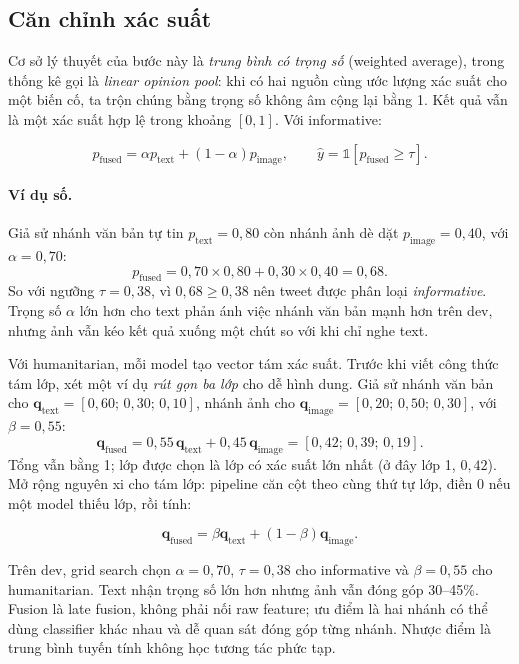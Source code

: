 \subsection{Căn chỉnh xác suất}

Cơ sở lý thuyết của bước này là \emph{trung bình có trọng số} (weighted average),
trong thống kê gọi là \emph{linear opinion pool}: khi có hai nguồn cùng ước
lượng xác suất cho một biến cố, ta trộn chúng bằng trọng số không âm cộng lại
bằng 1. Kết quả vẫn là một xác suất hợp lệ trong khoảng \([0,1]\). Với
informative:

\[
p_{\mathrm{fused}}
=\alpha p_{\mathrm{text}}+(1-\alpha)p_{\mathrm{image}},
\qquad
\hat y=\mathbb{1}[p_{\mathrm{fused}}\ge\tau].
\]

\paragraph{Ví dụ số.} Giả sử nhánh văn bản tự tin
\(p_{\mathrm{text}}=0{,}80\) còn nhánh ảnh dè dặt \(p_{\mathrm{image}}=0{,}40\),
với \(\alpha=0{,}70\):
\[
p_{\mathrm{fused}}=0{,}70\times0{,}80+0{,}30\times0{,}40=0{,}68.
\]
So với ngưỡng \(\tau=0{,}38\), vì \(0{,}68\ge0{,}38\) nên tweet được phân loại
\emph{informative}. Trọng số \(\alpha\) lớn hơn cho text phản ánh việc nhánh văn
bản mạnh hơn trên dev, nhưng ảnh vẫn kéo kết quả xuống một chút so với khi chỉ
nghe text.

Với humanitarian, mỗi model tạo vector tám xác suất. Trước khi viết công thức
tám lớp, xét một ví dụ \emph{rút gọn ba lớp} cho dễ hình dung. Giả sử nhánh văn
bản cho \(\mathbf{q}_{\mathrm{text}}=[0{,}60;\,0{,}30;\,0{,}10]\), nhánh ảnh cho
\(\mathbf{q}_{\mathrm{image}}=[0{,}20;\,0{,}50;\,0{,}30]\), với
\(\beta=0{,}55\):
\[
\mathbf{q}_{\mathrm{fused}}=0{,}55\,\mathbf{q}_{\mathrm{text}}
+0{,}45\,\mathbf{q}_{\mathrm{image}}
=[0{,}42;\,0{,}39;\,0{,}19].
\]
Tổng vẫn bằng 1; lớp được chọn là lớp có xác suất lớn nhất (ở đây lớp 1, \(0{,}42\)).
Mở rộng nguyên xi cho tám lớp: pipeline căn cột theo cùng thứ tự lớp, điền 0 nếu
một model thiếu lớp, rồi tính:

\[
\mathbf{q}_{\mathrm{fused}}
=\beta\mathbf{q}_{\mathrm{text}}
+(1-\beta)\mathbf{q}_{\mathrm{image}}.
\]

Trên dev, grid search chọn \(\alpha=0{,}70\), \(\tau=0{,}38\) cho informative
và \(\beta=0{,}55\) cho humanitarian. Text nhận trọng số lớn hơn nhưng ảnh vẫn
đóng góp 30--45\%. Fusion là late fusion, không phải nối raw feature; ưu điểm là
hai nhánh có thể dùng classifier khác nhau và dễ quan sát đóng góp từng nhánh.
Nhược điểm là trung bình tuyến tính không học tương tác phức tạp.

